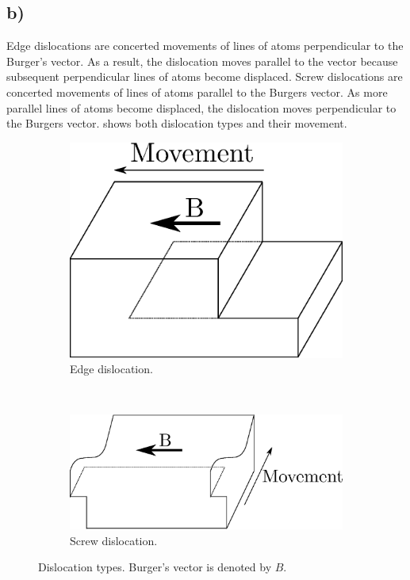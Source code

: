 \documentclass[a4paper]{article}
\begin{document}
	\subsection{b)}
	Edge dislocations are concerted movements of lines of atoms perpendicular to the Burger's vector. As a result, the dislocation moves parallel to the vector because subsequent perpendicular lines of atoms become displaced. Screw dislocations are concerted movements of lines of atoms parallel to the Burgers vector. As more parallel lines of atoms become displaced, the dislocation moves perpendicular to the Burgers vector.  shows both dislocation types and their movement.
	\begin{figure}
		\centering
		\begin{subfigure}[b]{0.45\linewidth}
			\centering
			\includegraphics[scale=0.5]{edgedis.eps}
			\caption{Edge dislocation.}
		\end{subfigure}
		~
		\begin{subfigure}[b]{0.45\linewidth}
			\centering
			\includegraphics[scale=0.5]{screwdis.eps}
			\caption{Screw dislocation.}
		\end{subfigure}
		\caption{Dislocation types. Burger's vector is denoted by $B$.}
		\label{f:dis}
	\end{figure}
\end{document}
